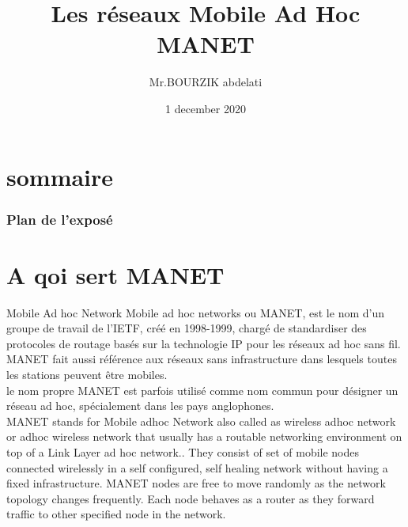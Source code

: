 \documentclass[11pt]{beamer}
\author{Mr.BOURZIK abdelati}
\title{Les réseaux Mobile Ad Hoc MANET}
\institute{\emph{UniversitySoltan moulay Sliman\\
Faculté Polydiscplinaire Beni Mellal}}
\date{1 december 2020}
\begin{document}
\begin{frame}
\titlepage
\end{frame}
\section*{sommaire}
\begin{frame}\frametitle{Plan de l'exposé}
\end{frame}
\section{A qoi sert MANET}
\begin{frame}{Mobile Ad hoc Network}
Mobile ad hoc networks ou MANET, est le nom d'un groupe de travail de l'IETF, créé en 1998-1999, chargé de standardiser des protocoles de routage basés sur la technologie IP pour les réseaux ad hoc sans fil. MANET fait aussi référence aux réseaux sans infrastructure dans lesquels toutes les stations peuvent être mobiles.
\\
le nom propre MANET est parfois utilisé comme nom commun pour désigner un réseau ad hoc, spécialement dans les pays anglophones.\\
MANET stands for Mobile adhoc Network also called as wireless adhoc network or adhoc wireless network that usually has a routable networking environment on top of a Link Layer ad hoc network.. They consist of set of mobile nodes connected wirelessly in a self configured, self healing network without having a fixed infrastructure. MANET nodes are free to move randomly as the network topology changes frequently. Each node behaves as a router as they forward traffic to other specified node in the network.
\end{frame}
\end{document}

